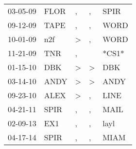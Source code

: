 \begin{supertabular}{lllll}
 03-05-09 &  FLOR &             , &             , &   SPIR \\
 09-12-09 &  TAPE &             , &             , &   WORD \\
 10-01-09 &   n2f &  \textgreater &             , &   WORD \\
 11-21-09 &   TNR &             , &               &  *CS1* \\
 01-15-10 &   DBK &  \textgreater &  \textgreater &    DBK \\
 03-14-10 &  ANDY &  \textgreater &  \textgreater &   ANDY \\
 09-23-10 &  ALEX &  \textgreater &             , &   LINE \\
 04-21-11 &  SPIR &             , &             , &   MAIL \\
 02-09-13 &   EX1 &             , &             , &   layl \\
 04-17-14 &  SPIR &             , &             , &   MIAM \\
\end{supertabular}
